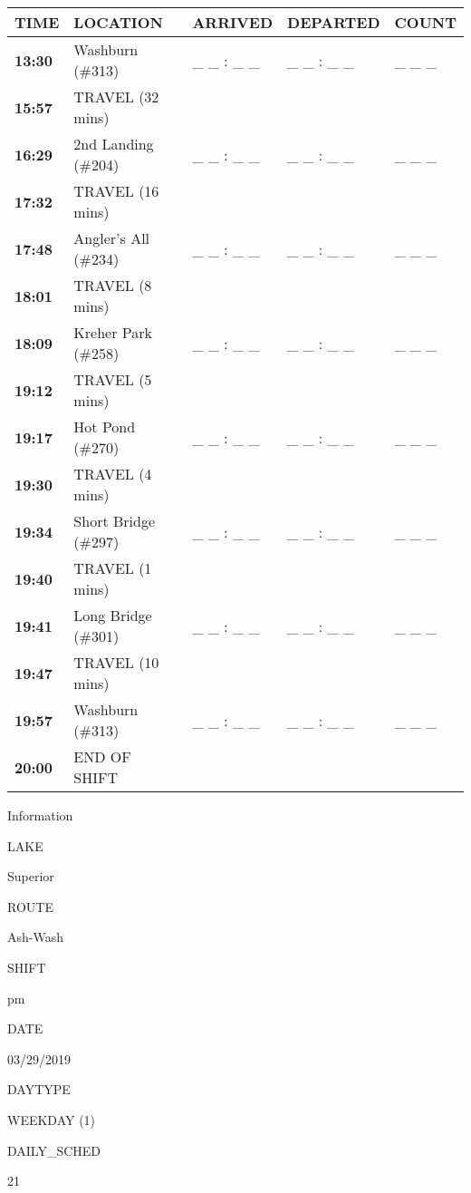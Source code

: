 \documentclass[]{article}
\begin{document}
\begin{tabular}{>{\bfseries}lllll}
\toprule
\textbf{TIME} & \textbf{LOCATION} & \textbf{ARRIVED} & \textbf{DEPARTED} & \textbf{COUNT}\\
\midrule
13:30 & Washburn (\#313) & \_ \_ : \_ \_ & \_ \_ : \_ \_ & \_ \_ \_\\
15:57 & TRAVEL (32 mins) &  &  & \\
16:29 & 2nd Landing (\#204) & \_ \_ : \_ \_ & \_ \_ : \_ \_ & \_ \_ \_\\
17:32 & TRAVEL (16 mins) &  &  & \\
17:48 & Angler's All (\#234) & \_ \_ : \_ \_ & \_ \_ : \_ \_ & \_ \_ \_\\
18:01 & TRAVEL (8 mins) &  &  & \\
18:09 & Kreher Park (\#258) & \_ \_ : \_ \_ & \_ \_ : \_ \_ & \_ \_ \_\\
19:12 & TRAVEL (5 mins) &  &  & \\
19:17 & Hot Pond (\#270) & \_ \_ : \_ \_ & \_ \_ : \_ \_ & \_ \_ \_\\
19:30 & TRAVEL (4 mins) &  &  & \\
19:34 & Short Bridge (\#297) & \_ \_ : \_ \_ & \_ \_ : \_ \_ & \_ \_ \_\\
19:40 & TRAVEL (1 mins) &  &  & \\
19:41 & Long Bridge (\#301) & \_ \_ : \_ \_ & \_ \_ : \_ \_ & \_ \_ \_\\
19:47 & TRAVEL (10 mins) &  &  & \\
19:57 & Washburn (\#313) & \_ \_ : \_ \_ & \_ \_ : \_ \_ & \_ \_ \_\\
20:00 & END OF SHIFT &  &  & \\
\bottomrule
\end{tabular}\newpage

Information

LAKE

Superior

ROUTE

Ash-Wash

SHIFT

pm

DATE

03/29/2019

DAYTYPE

WEEKDAY (1)

DAILY\_SCHED

21

\vspace{24pt}
\end{document}
